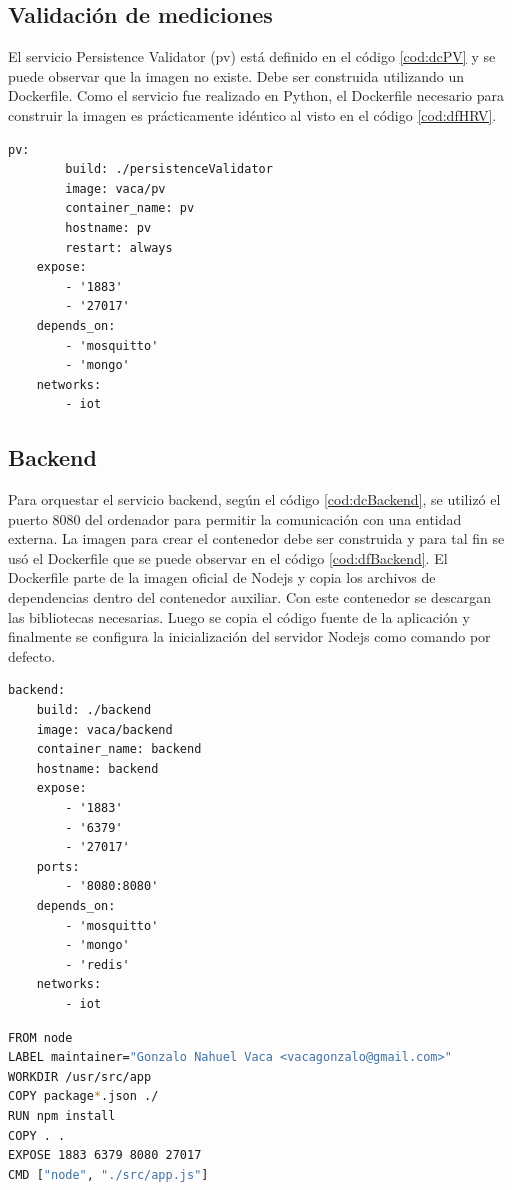 \newpage

\subsection{Validación de mediciones}

El servicio Persistence Validator (pv) está definido en el código \ref{cod:dcPV} y se puede observar que la imagen no existe.
Debe ser construida utilizando un Dockerfile.
Como el servicio fue realizado en Python, el Dockerfile necesario para construir la imagen es prácticamente idéntico al visto en el código \ref{cod:dfHRV}.


\begin{lstlisting}[label=cod:dcPV,caption=Orquestación del servicio pv.]
	pv:
		build: ./persistenceValidator
		image: vaca/pv
		container_name: pv
		hostname: pv
		restart: always
	expose: 
		- '1883'
		- '27017'
	depends_on: 
		- 'mosquitto'
		- 'mongo'
	networks: 
		- iot
\end{lstlisting}

\subsection{Backend}

Para orquestar el servicio backend, según el código \ref{cod:dcBackend}, se utilizó el puerto 8080 del ordenador para permitir la comunicación con una entidad externa.
La imagen para crear el contenedor debe ser construida y para tal fin se usó el Dockerfile que se puede observar en el código \ref{cod:dfBackend}.
El Dockerfile parte de la imagen oficial de Nodejs y copia los archivos de dependencias dentro del contenedor auxiliar.
Con este contenedor se descargan las bibliotecas necesarias.
Luego se copia el código fuente de la aplicación y finalmente se configura la inicialización del servidor Nodejs como comando por defecto.

\begin{lstlisting}[label=cod:dcBackend,caption=Orquestación del servicio Backend.]
backend:
	build: ./backend
	image: vaca/backend
	container_name: backend
	hostname: backend
	expose: 
		- '1883'
		- '6379'
		- '27017'
	ports: 
		- '8080:8080'
	depends_on:
		- 'mosquitto' 
		- 'mongo'
		- 'redis'
	networks: 
		- iot
\end{lstlisting}

\newpage

\begin{lstlisting}[language=bash,label=cod:dfBackend,caption=Dockerfile del servicio Backend.]
FROM node
LABEL maintainer="Gonzalo Nahuel Vaca <vacagonzalo@gmail.com>"
WORKDIR /usr/src/app
COPY package*.json ./
RUN npm install
COPY . .
EXPOSE 1883 6379 8080 27017
CMD ["node", "./src/app.js"]
\end{lstlisting}

